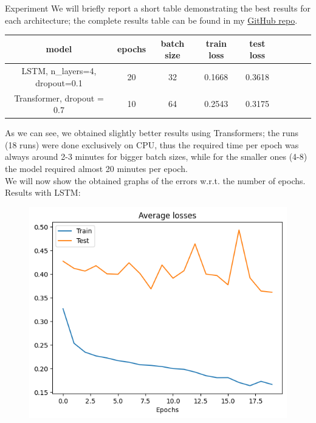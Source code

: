 \documentclass[aspectratio=169,t,xcolor=table]{beamer}
\begin{document}
\begin{frame}[allowframebreaks]{Experiment}
We will briefly report a short table demonstrating the best results for each architecture; the complete results table can be found in my \href{https://github.com/lorenzozanolin/StateEstimation}{GitHub repo}.%
\begin{table}[]
    \begin{tabular}{|c|c|c|c|c|c|c|c|c|}
    \hline
    \textbf{model} & \textbf{epochs} & \textbf{batch size} & \textbf{train loss} & \textbf{test loss} \\ \hline
    LSTM, n\_layers=4, dropout=0.1                                  & 20                                     & 32                                         & 0.1668              & 0.3618             \\ \hline
    Transformer, dropout = 0.7            & 10                                     & 64                                         & 0.2543               & 0.3175             \\ \hline
    \end{tabular}
    \end{table}
As we can see, we obtained slightly better results using Transformers; the runs (18 runs) were done exclusively on CPU, thus the required time per epoch was always around 2-3 minutes for bigger batch sizes, while for the smaller ones (4-8) the model required almost 20 minutes per epoch.\\
\vspace{5mm}
We will now show the obtained graphs of the errors w.r.t. the number of epochs.\\
\vspace{4mm}
Results with LSTM:
\begin{figure}[!htb]
    \begin{center}
        \begin{minipage}{0.45\textwidth}
            \centering
            \includegraphics[width=\linewidth]{../outputs/lstmError.png}

\end{minipage}
\end{center}
\end{figure}
\end{frame}
\end{document}
